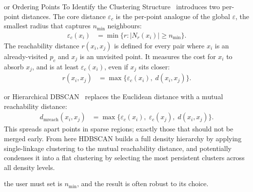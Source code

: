  or Ordering Points To Identify the Clustering Structure~\cite{Ankerst1999}
introduces two per-point distances. The core distance $\varepsilon_c$ is the per-point analogue of 
the global $\varepsilon$, the smallest radius that captures $n_{\min}$ neighbours:
\begin{align*}
    \varepsilon_c(x_i) &= \min\{r : |N_r(x_i)| \geq n_{\min}\}.
\end{align*}
The reachability distance $r(x_i, x_j)$ is defined for every pair where $x_i$ is an already-visited $p_c$
and $x_j$ is an unvisited point. It measures the cost for $x_i$ to absorb $x_j$,
and is at least $\varepsilon_c(x_i)$, even if $x_j$ sits closer:
\begin{align*}
    r(x_i, x_j) &= \max\!\big\{\varepsilon_c(x_i),\; d(x_i, x_j)\big\}.
\end{align*}







 or Hierarchical DBSCAN~\cite{Campello2013} replaces the Euclidean distance with a 
mutual reachability distance:
\begin{align*}
    d_{\mathrm{mreach}}(x_i, x_j) &= \max\!\big\{\varepsilon_c(x_i),\; \varepsilon_c(x_j),\; d(x_i, x_j)\big\}.
\end{align*}
This spreads apart points in sparse regions; exactly those that should not be merged early.
From here HDBSCAN builds a full density hierarchy by applying single-linkage clustering to the mutual reachability distance, and 
potentially condenses it into a flat clustering by selecting the most persistent clusters across all density levels.


 the user must set is $n_{\min}$, and the result is often robust to its choice.




















